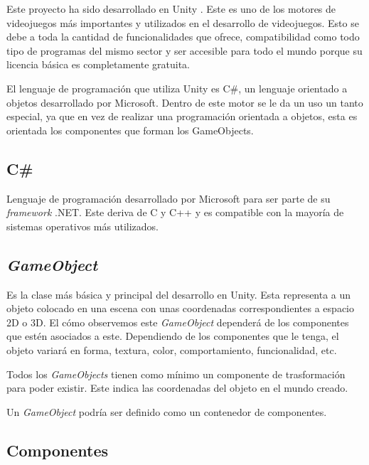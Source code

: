Este proyecto ha sido desarrollado en Unity \cite{unity:unity}. Este es uno de los motores de videojuegos más importantes y utilizados en el desarrollo de videojuegos. Esto se debe a toda la cantidad de funcionalidades que ofrece, compatibilidad como todo tipo de programas del mismo sector y ser accesible para todo el mundo porque su licencia básica es completamente gratuita.

El lenguaje de programación que utiliza Unity es C\#, un lenguaje orientado a objetos desarrollado por Microsoft. Dentro de este motor se le da un uso un tanto especial, ya que en vez de realizar una programación orientada a objetos, esta es orientada los componentes que forman los GameObjects.

\subsection{C\#}

Lenguaje de programación \cite{Microsoft:c} desarrollado por Microsoft para ser parte de su \textit{framework} .NET. Este deriva de C y C++ y es compatible con la mayoría de sistemas operativos más utilizados. 

\subsection{\textit{GameObject}}

Es la clase más básica y principal del desarrollo en Unity. Esta representa a un objeto colocado en una escena con unas coordenadas correspondientes a espacio 2D o 3D. El cómo observemos este \textit{GameObject} \cite{unity:gameobject} dependerá de los componentes que estén asociados a este. Dependiendo de los componentes que le tenga, el objeto variará en forma, textura, color, comportamiento, funcionalidad, etc.

Todos los \textit{GameObjects} tienen como mínimo un componente de trasformación para poder existir. Este indica las coordenadas del objeto en el mundo creado.

Un \textit{GameObject} podría ser definido como un contenedor de componentes.

\subsection{Componentes}

